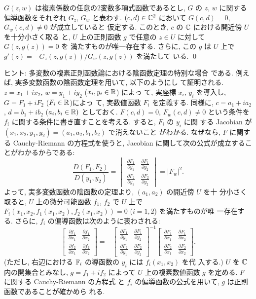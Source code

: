 \documentclass[12pt,twoside]{jarticle}
\def\R{{\Bbb R}} %
\def\C{{\Bbb C}} %
\def\F{{\Bbb F}}
\def\pd#1#2{\frac{\partial #1}{\partial #2}}
\begin{document}
\begin{question}
  $G(z,w)$ は複素係数の任意の2変数多項式函数であるとし, $G$ の %
  $z$, $w$ に関する偏導函数をそれぞれ $G_z$, $G_w$ と表わす. %
  $(c,d)\in\C^2$ において $G(c,d)=0$, $G_w(c,d)\ne0$ が成立していると
  仮定する. このとき, $c$ の $\C$ における開近傍 $U$ を十分小さく取る
  と, $U$ 上の正則函数 $g$ で任意の $z\in U$ に対して $G(z,g(z))=0$ を
  満たすものが唯一存在する. さらに, %
  この $g$ は $U$ 上で $g'(z) = - G_z(z,g(z))/G_w(z,g(z))$ を満たして
  いる.  \qed
\end{question}

\noindent ヒント: 多変数の複素正則函数論における陰函数定理の特別な場合
である. 例えば, 実多変数函数の陰函数定理を用いて, 以下のようにし
て証明される. $z=x_1 + i x_2$, $w = y_1 + i y_2$ ($x_i,y_i\in\R$) によっ
て, 実座標 $x_i$, $y_i$ を導入し, $G = F_1 + i F_2$ ($F_i\in\R$)によっ
て, 実数値函数 $F_i$ を定義する. 同様に, $c=a_1+ia_2$, $d=b_1+ib_2$ %
($a_i,b_i\in\R)$ としておく. $F(c,d)=0$, $F_w(c,d)\ne0$ という条件を %
$f_i$ に関する条件に書き直すことを考える. すると, $F_i$ の $y_i$ に関
する Jacobian が $(x_1,x_2,y_1,y_2)=(a_1,a_2,b_1,b_2)$ で消えないこと
がわかる. なぜなら, $F$ に関する Cauchy-Riemann の方程式を使うと,
Jacobian に関して次の公式が成立することがわかるからである:
\[
  \frac{D(F_1,F_2)}{D(y_1,y_2)}
  =
  \begin{vmatrix}
    \pd{F_1}{y_1} & \pd{F_1}{y_2} \\
    \pd{F_2}{y_1} & \pd{F_2}{y_2} 
  \end{vmatrix}
  = |F_w|^2.
\]
よって, 実多変数函数の陰函数の定理より, $(a_1,a_2)$ の開近傍 $U$ を十
分小さく取ると, $U$ 上の微分可能函数 $f_1$, $f_2$ で $U$ 上で %
$F_i(x_1,x_2,f_1(x_1,x_2),f_2(x_1,x_2))=0$ ($i=1,2$) を満たすものが唯
一存在する. さらに, $f_i$ の偏導函数は次のように表わされる:
\[
  \begin{bmatrix}
    \pd{f_1}{x_1} & \pd{f_1}{x_2} \\
    \pd{f_2}{x_1} & \pd{f_2}{x_2} 
  \end{bmatrix}
  = -
  \begin{bmatrix}
    \pd{F_1}{y_1} & \pd{F_1}{y_2} \\
    \pd{F_2}{y_1} & \pd{F_2}{y_2} 
  \end{bmatrix}^{-1}
  \begin{bmatrix}
    \pd{F_1}{x_1} & \pd{F_1}{x_2} \\
    \pd{F_2}{x_1} & \pd{F_2}{x_2} 
  \end{bmatrix}.
\] 
(ただし, 右辺における $\F_i$ の導函数の $y_i$ には $f_i(x_1,x_2)$ を代
入する.)  $U$ を $\C$ 内の開集合とみなし, $g=f_1+if_2$ によって $U$ 
上の複素数値函数 $g$ を定める. $F$ に関する Cauchy-Riemann の方程式
と $f_i$ の偏導函数の公式を用いて, $g$ は正則函数であることが確かめら
れる. 
\end{document}
